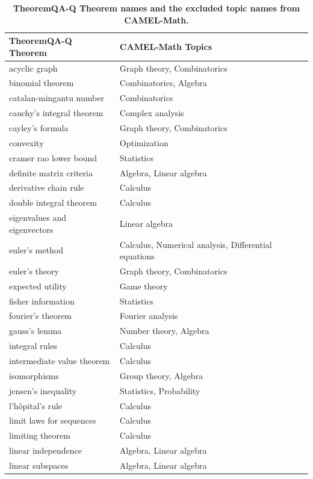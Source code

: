 \begin{table}
\caption{
    \textbf{
        TheoremQA-Q Theorem names and the excluded topic names from CAMEL-Math.
    }}
\centering
\begin{tabular}{ll}
    \toprule
    TheoremQA-Q Theorem & CAMEL-Math Topics \\ \midrule
    acyclic graph & Graph theory, Combinatorics \\ 
    binomial theorem & Combinatorics, Algebra \\
    catalan-mingantu number & Combinatorics \\
    cauchy's integral theorem & Complex analysis \\
    cayley's formula & Graph theory, Combinatorics \\
    convexity & Optimization \\
    cramer rao lower bound & Statistics \\
    definite matrix criteria & Algebra, Linear algebra \\
    derivative chain rule & Calculus \\
    double integral theorem & Calculus \\
    eigenvalues and eigenvectors & Linear algebra \\
    euler's method & Calculus, Numerical analysis, Differential equations \\
    euler's theory & Graph theory,  Combinatorics \\
    expected utility & Game theory \\
    fisher information & Statistics \\
    fourier's theorem & Fourier analysis \\
    gauss's lemma & Number theory, Algebra \\
    integral rules & Calculus \\
    intermediate value theorem & Calculus \\
    isomorphisms & Group theory, Algebra \\
    jensen's inequality & Statistics, Probability \\
    l'hôpital's rule & Calculus \\
    limit laws for sequences & Calculus \\
    limiting theorem & Calculus \\
    linear independence & Algebra, Linear algebra \\
    linear subspaces & Algebra, Linear algebra \\

\end{tabular}
\end{table}
